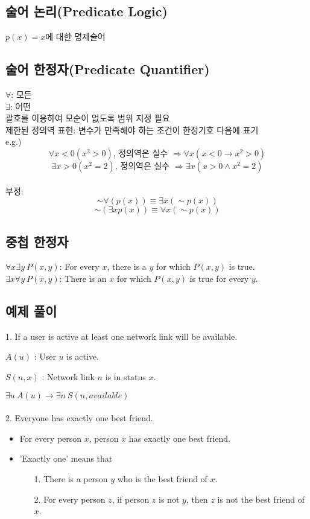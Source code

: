 \subsection{술어 논리(Predicate Logic)}
$p(x)=x$에 대한 명제술어
\subsection{술어 한정자(Predicate Quantifier)}
$\forall$: 모든\\
$\exists$: 어떤\\
괄호를 이용하여 모순이 없도록 범위 지정 필요\\
제한된 정의역 표현: 변수가 만족해야 하는 조건이 한정기호 다음에 표기\\
e.g.) $$\forall x<0(x^2>0)\text{, 정의역은 실수 }\Longrightarrow \forall x (x < 0 \rightarrow x^2>0)$$
$$\exists x>0(x^2=2)\text{, 정의역은 실수 }\Longrightarrow \exists x(x>0 \land x^2=2)$$
\\
부정:
$$\sim \forall(p(x)) \equiv \exists x(\sim p(x))$$
$$\sim (\exists x p(x)) \equiv \forall x(\sim p(x))$$

\subsection{중첩 한정자}
$\forall x \exists y\ P(x, y)$: For every $x$, there is a $y$ for which $P(x, y)$ is true.\\
$\exists x \forall y\ P(x, y)$: There is an $x$ for which $P(x, y)$ is true for every $y$.

\subsection{예제 풀이}
1. If a user is active at least one network link will be available.

$A(u)$ : User $u$ is active.

$S(n, x)$ : Network link $n$ is in status $x$.

$\exists u\ A(u) \to \exists n\ S(n, available)$\\\\
2. Everyone has exactly one best friend.
\begin{itemize}[label=$\to$]
    \item For every person $x$, person $x$ has exactly one best friend.
    \item 'Exactly one' means that
    \begin{itemize}
        \item[1.] There is a person $y$ who is the best friend of $x$.
        \item[2.] For every person $z$, if person $z$ is not $y$, then $z$ is not the best friend of $x$.
    \end{itemize}
\end{itemize}


